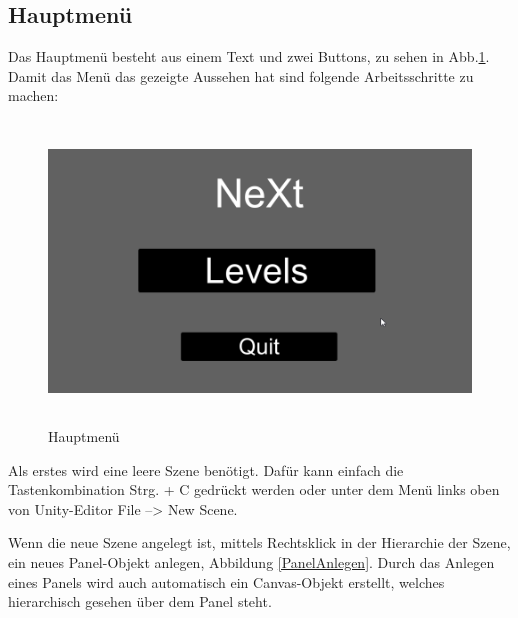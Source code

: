 \subsection{Hauptmenü}
Das Hauptmenü besteht aus einem Text und zwei Buttons, zu sehen in Abb.\ref{Mainmenu}. Damit das Menü das gezeigte Aussehen hat sind folgende Arbeitsschritte zu machen:

\begin{figure}[H]
	\centering
	\includegraphics[height=8cm]{images/Mainmenu.png}
	\caption{Hauptmenü}
	\label{Mainmenu}
\end{figure}
Als erstes wird eine leere Szene benötigt. Dafür kann einfach die Tastenkombination Strg. + C gedrückt werden oder unter dem Menü links oben von Unity-Editor File –> New Scene.

Wenn die neue Szene angelegt ist, mittels Rechtsklick in der Hierarchie der Szene, ein neues Panel-Objekt anlegen, Abbildung \ref{PanelAnlegen}. Durch das Anlegen eines Panels wird auch automatisch ein Canvas-Objekt erstellt, welches hierarchisch gesehen über dem Panel steht.

